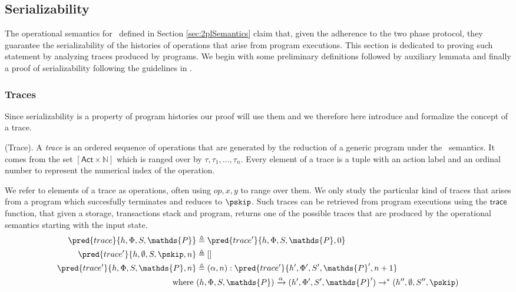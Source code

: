 \subsection{Serializability}

The operational semantics for \tpl\ defined in Section \ref{sec:2plSemantics} claim that, given the adherence to the two phase protocol, they guarantee the serializability of the histories of operations that arise from program executions. This section is dedicated to proving such statement by analyzing traces produced by programs. We begin with some preliminary definitions followed by auxiliary lemmata and finally a proof of serializability following the guidelines in \cite{ccontrol}.

\subsubsection{Traces}

Since serializability is a property of program histories our proof will use them and we therefore here introduce and formalize the concept of a trace.

\begin{defn}
	(Trace).
	A \emph{trace} is an ordered sequence of operations that are generated by the reduction of a generic program under the \tpl\ semantics. It comes from the set $[\mathsf{Act} \times \mathds{N}]$ which is ranged over by $\tau, \tau_1, \ldots, \tau_n$. Every element of a trace is a tuple with an action label and an ordinal number to represent the numerical index of the operation.
\end{defn}

We refer to elements of a trace as operations, often using $op, x, y$ to range over them. We only study the particular kind of traces that arises from a program which succesfully terminates and reduces to $\pskip$. Such traces can be retrieved from program executions using the $\mathsf{trace}$ function, that given a storage, transactions stack and program, returns one of the possible traces that are produced by the operational semantics starting with the input state.
\begin{align*}
	\pred{trace}{h, \Phi, S, \mathds{P}} &\triangleq \pred{trace'}{h, \Phi, S, \mathds{P}, 0} \\
	\pred{trace'}{h, \emptyset, S, \pskip, n} &\triangleq [] \\
	\pred{trace'}{h, \Phi, S, \mathds{P}, n} &\triangleq (\alpha, n) : \pred{trace'}{h', \Phi', S', \mathds{P}', n+ 1}
	\\
	\text{where }& (h, \Phi, S, \mathds{P}) \xrightarrow{\alpha} (h', \Phi', S', \mathds{P}') \rightarrow^* (h'', \emptyset, S'', \pskip)
\end{align*}

